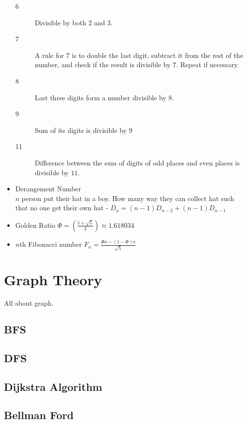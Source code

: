 \documentclass[10pt, a4paper]{article}
\begin{document}
\begin{multicols}{2}
\begin{itemize}
\begin{description}
	   	\item[6] Divisible by both $2$ and $3$.
	   	\item[7] A rule for $7$ is to double the last digit, subtract it from the rest of the number, and check if the result is divisible by $7$. Repeat if necessary.
	   	\item[8]  Last three digits form a number divisible by $8$.
	   	\item[9] Sum of its digits is divisible by $9$
	   	\item[11] Difference between the sum of digits of odd places and even places is divisible by $11$.
   \end{description}
   \item Derangement Number\\
   $n$ person put their hat in a boy. How many way they can collect hat such that no one get their own hat - 
   \(D_n = (n - 1)D_{n - 2} + (n - 1)D_{n - 1}\)
   \item Golden Ratio \(
   	\Phi = (\frac{1 + \sqrt{5}}{2}) \approx 1.618034 
   \)
   \item $n$th Fibonacci number \(
   	F_n = \frac{\Phi n - ( 1 - \Phi)n} {\sqrt{5}}
   \)
\end{itemize}

\section{Graph Theory}
All about graph.

\subsection{BFS}


\subsection{DFS}


\subsection{Dijkstra Algorithm}


\subsection{Bellman Ford}



\end{multicols}
\end{document}
